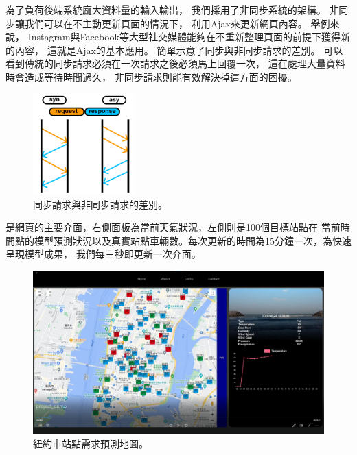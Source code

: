 \documentclass[a4paper,14pt]{extarticle}
\begin{document}
            為了負荷後端系統龐大資料量的輸入輸出，
            我們採用了非同步系統的架構。
            非同步讓我們可以在不主動更新頁面的情況下，
            利用Ajax來更新網頁內容。
            舉例來說，
            Instagram與Facebook等大型社交媒體能夠在不重新整理頁面的前提下獲得新的內容，
            這就是Ajax的基本應用。
             簡單示意了同步與非同步請求的差別。
            可以看到傳統的同步請求必須在一次請求之後必須馬上回覆一次，
            這在處理大量資料時會造成等待時間過久，
            非同步請求則能有效解決掉這方面的困擾。
            \begin{figure}[htbp]
                \centering
                \includegraphics[width=0.35\textwidth]{asynchronous.png}
                \caption{
                    同步請求與非同步請求的差別。
                }
                \label{fig:asynchronous}
            \end{figure}

             是網頁的主要介面，右側面板為當前天氣狀況，左側則是100個目標站點在
            當前時間點的模型預測狀況以及真實站點車輛數。每次更新的時間為15分鐘一次，為快速呈現模型成果，
            我們每三秒即更新一次介面。
            \begin{figure}[htbp]
                \centering
                \includegraphics[width=\textwidth]{web-view.png}
                \caption{
                    紐約市站點需求預測地圖。
                }
                \label{fig:web-view}
            \end{figure}
\end{document}
